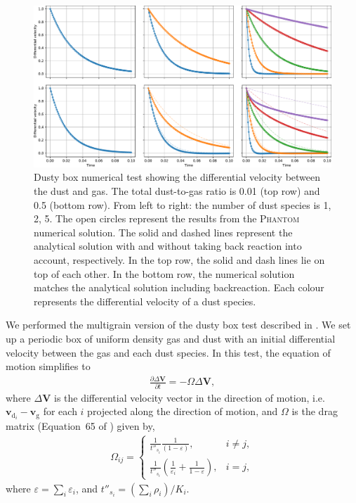 \documentclass[fleqn,usenatbib]{mnras}
\newcommand{\g}{\mathrm{g}}
\newcommand{\dd}{\mathrm{d}}
\let\vec\bm
\begin{document}
\begin{figure}
   \begin{center}
      \includegraphics[width=\textwidth]{figs/dustybox_differential_velocity_comparison.pdf}
      \caption{Dusty box numerical test showing the differential velocity
         between the dust and gas. The total dust-to-gas ratio is 0.01 (top row)
         and 0.5 (bottom row). From left to right: the number of dust species is
         1, 2, 5. The open circles represent the results from the
         \textsc{Phantom} numerical solution. The solid and dashed lines
         represent the analytical solution with and without taking back reaction
         into account, respectively. In the top row, the solid and dash lines
         lie on top of each other. In the bottom row, the numerical solution
         matches the analytical solution including backreaction. Each colour
         represents the differential velocity of a dust species.%
         \label{fig:dustybox}}
   \end{center}
\end{figure}

We performed the multigrain version of the dusty box test described in
\citet{Laibe2011MNRAS.418.1491L}. We set up a periodic box of uniform density
gas and dust with an initial differential velocity between the gas and each dust
species. In this test, the equation of motion simplifies to
%
\begin{align}
   \frac{\partial \Delta \vec{V}}{\partial t} = - \Omega \Delta \vec{V},
\end{align}
%
where \(\Delta \vec{V}\) is the differential velocity vector in the direction of
motion, i.e. \(\vec{v}_{\dd_i} - \vec{v}_{\g}\) for each \(i\) projected along
the direction of motion, and \(\Omega\) is the drag matrix (Equation~65 of
\citealt{Laibe2014MNRAS.444.1940L}) given by,
%
\begin{align}
   \Omega_{ij} =
   \begin{cases}
      \frac{1}{t''_{s_i}} \frac{1}{(1 - \varepsilon)}, &i \neq j,\\
      \frac{1}{t''_{s_i}} \left( \frac{1}{\varepsilon_i} +
         \frac{1}{1 - \varepsilon} \right), &i = j,
   \end{cases}
\end{align}
%
where \( \varepsilon = \sum_i \varepsilon_i \), and \( t''_{s_i} = \left( \sum_i
\rho_i \right) / K_i \).
\end{document}
